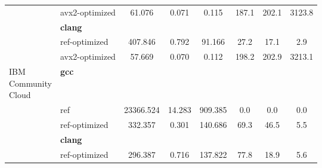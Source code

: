 \begin{table}
\begin{tabularx}{\linewidth}{l l c c c c c c}
          & avx2-optimized & 61.076 & 0.071 & 0.115 & 187.1 & 202.1 & 3123.8\\
          & \textbf{clang} & & & & & \\
          & ref-optimized & 407.846 & 0.792 & 91.166 & 27.2 & 17.1 & 2.9\\
          & avx2-optimized & 57.669 & 0.070 & 0.112 & 198.2 & 202.9 & 3213.1\\
          \midrule
          \multirowcell{5}{IBM\\ Community\\ Cloud}
          & \textbf{gcc} & & & & & \\
          & ref & 23366.524 & 14.283 & 909.385 & 0.0 & 0.0 & 0.0\\
          & ref-optimized & 332.357 & 0.301 & 140.686 & 69.3 & 46.5 & 5.5\\
          & \textbf{clang} & & & & & \\
          & ref-optimized & 296.387 & 0.716 & 137.822 & 77.8 & 18.9 & 5.6\\
        \bottomrule
    \end{tabularx}
\end{table}